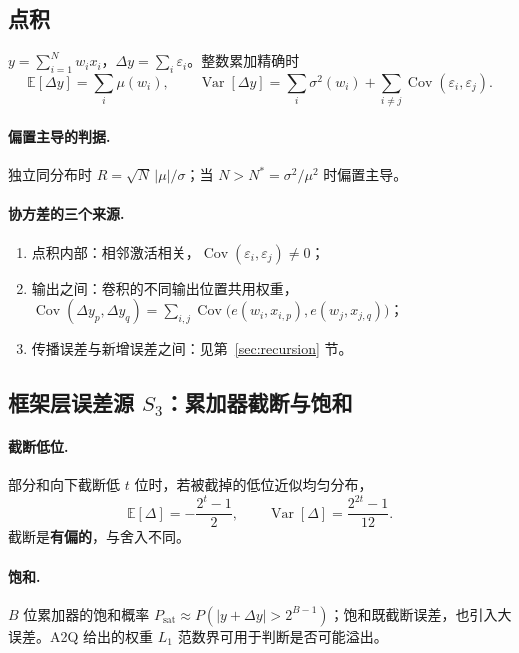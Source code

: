 \documentclass[11pt,a4paper]{ctexart}
\newcommand{\E}{\mathbb{E}}
\DeclareMathOperator{\Var}{Var}
\DeclareMathOperator{\Cov}{Cov}
\begin{document}
\subsection{点积}
$y = \sum_{i=1}^{N} w_i x_i$，$\Delta y = \sum_i \varepsilon_i$。整数累加精确时
\begin{equation}
\E[\Delta y] = \sum_{i} \mu(w_i),\qquad
\Var[\Delta y] = \sum_{i} \sigma^2(w_i) + \sum_{i \neq j} \Cov(\varepsilon_i, \varepsilon_j).
\end{equation}
\paragraph{偏置主导的判据.} 独立同分布时 $R = \sqrt N\,|\mu|/\sigma$；当 $N > N^{*} = \sigma^2/\mu^2$ 时偏置主导。

\paragraph{协方差的三个来源.}
\begin{enumerate}[leftmargin=*]
  \item 点积内部：相邻激活相关，$\Cov(\varepsilon_i,\varepsilon_j) \ne 0$；
  \item 输出之间：卷积的不同输出位置共用权重，$\Cov(\Delta y_p, \Delta y_q) = \sum_{i,j}\Cov\bigl(e(w_i,x_{i,p}), e(w_j,x_{j,q})\bigr)$；
  \item 传播误差与新增误差之间：见第~\ref{sec:recursion} 节。
\end{enumerate}

\subsection{框架层误差源 $S_3$：累加器截断与饱和}
\paragraph{截断低位.} 部分和向下截断低 $t$ 位时，若被截掉的低位近似均匀分布，
\begin{equation}
\E[\Delta] = -\frac{2^t - 1}{2},\qquad \Var[\Delta] = \frac{2^{2t} - 1}{12}.
\end{equation}
截断是\textbf{有偏的}，与舍入不同。
\paragraph{饱和.} $B$ 位累加器的饱和概率 $P_{\text{sat}} \approx P(|y + \Delta y| > 2^{B-1})$；饱和既截断误差，也引入大误差。A2Q \cite{a2q} 给出的权重 $L_1$ 范数界可用于判断是否可能溢出。
\end{document}
